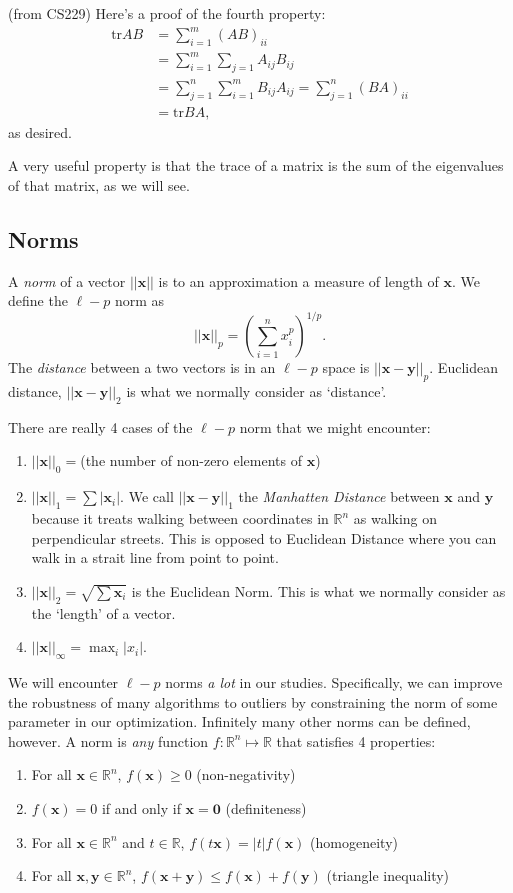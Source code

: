 \documentclass{article}
\newcommand{\1}{\mathbf{1}}
\newcommand{\tr}{\mathrm{tr}}
\newcommand{\0}{\mathbf{0}}
\newcommand{\xx}{\mathbf{x}}
\newcommand{\yy}{\mathbf{y}}
\newcommand{\RR}{\mathbb{R}}
\begin{document}
(from CS229) Here's a proof of the fourth property:
\begin{align*}
    \tr AB &= \sum_{i=1}^m(AB)_{ii}\\
    &= \sum_{i=1}^m\sum_{j=1} A_{ij}B_{ij}\\
    &= \sum_{j=1}^n\sum_{i=1}^m B_{ij}A_{ij} = \sum_{j=1}^n (BA)_{ii}\\
    &= \tr BA,
\end{align*}
as desired.

A very useful property is that the trace of a matrix is the sum
of the eigenvalues of that matrix, as we will see.

\subsection{Norms}

A \textit{norm} of a vector $||\xx||$ is to an approximation a measure of
length of $\xx$. We define the $\ell-p$ norm as
\[
    ||\xx||_p = \left( \sum_{i=1}^n x_i^p \right)^{1/p}.
\]
The \textit{distance} between a two vectors is in an $\ell-p$ space
is $||\xx-\yy||_p$. Euclidean distance, $||\xx-\yy||_2$ is what we normally
consider as `distance'.

There are really 4 cases of the $\ell-p$ norm that we might encounter:
\begin{enumerate}[-]
    \item $||\xx||_0 = $(the number of non-zero elements of $\xx$)
    \item $||\xx||_1 = \sum |\xx_i|$. We call $||\xx-\yy||_1$ the \textit{Manhatten Distance}
        between $\xx$ and $\yy$ because it treats walking between coordinates in
        $\RR^n$ as walking on perpendicular streets. This is opposed to Euclidean Distance
        where you can walk in a strait line from point to point.
    \item $||\xx||_2 = \sqrt{\sum\xx_i}$ is the Euclidean Norm. This is what we normally
        consider as the `length' of a vector.
    \item $||\xx||_\infty = \max_i |x_i|$.
\end{enumerate}
We will encounter $\ell-p$ norms \textit{a lot} in our studies. Specifically, we can
improve the robustness of many algorithms to outliers by constraining the norm
of some parameter in our optimization. Infinitely many other norms can be defined,
however. A norm is \textit{any} function $f : \RR^n \mapsto \RR$ that satisfies 4
properties:
\begin{enumerate}
\item For all $\xx\in\RR^n$, $f(\xx)\geq 0$ \hfill (non-negativity)
\item $f(\xx)=0$ if and only if $\xx=\0$ \hfill (definiteness)
\item For all $\xx\in\RR^n$ and $t\in\RR$, $f(t\xx) = |t|f(\xx)$ \hfill (homogeneity)
\item For all $\xx,\yy\in\RR^n$, $f(\xx+\yy) \leq f(\xx) + f(\yy)$ \hfill (triangle inequality)\\
\end{enumerate}
\end{document}
